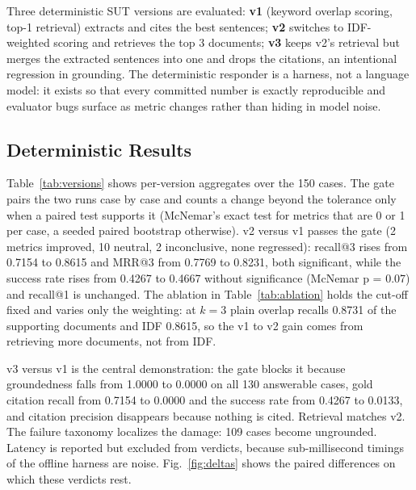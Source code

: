 \documentclass[conference]{IEEEtran}
\begin{document}
Three deterministic SUT versions are evaluated: \textbf{v1} (keyword
overlap scoring, top-1 retrieval) extracts and cites the best sentences;
\textbf{v2} switches to IDF-weighted scoring and retrieves the top 3
documents; \textbf{v3} keeps v2's retrieval but merges the extracted
sentences into one and drops the citations, an intentional regression in
grounding. The deterministic responder is a harness, not a language model:
it exists so that every committed number is exactly reproducible and
evaluator bugs surface as metric changes rather than hiding in model noise.

\subsection{Deterministic Results}
Table~\ref{tab:versions} shows per-version aggregates over the 150 cases.
The gate pairs the two runs case by case and counts a change beyond the
tolerance only when a paired test supports it (McNemar's exact test for
metrics that are 0 or 1 per case, a seeded paired bootstrap otherwise).
v2 versus v1 passes the gate (2 metrics improved, 10 neutral, 2
inconclusive, none regressed): recall@3 rises from 0.7154 to 0.8615 and
MRR@3 from 0.7769 to 0.8231, both significant, while the success rate rises
from 0.4267 to 0.4667 without significance (McNemar p = 0.07) and recall@1
is unchanged. The ablation in Table~\ref{tab:ablation} holds the cut-off
fixed and varies only the weighting: at $k=3$ plain overlap recalls 0.8731
of the supporting documents and IDF 0.8615, so the v1 to v2 gain comes from
retrieving more documents, not from IDF.

v3 versus v1 is the central demonstration: the gate blocks it because
groundedness falls from 1.0000 to 0.0000 on all 130 answerable cases, gold
citation recall from 0.7154 to 0.0000 and the success rate from 0.4267 to
0.0133, and citation precision disappears because nothing is cited.
Retrieval matches v2. The failure taxonomy localizes the damage: 109 cases
become ungrounded. Latency is reported but excluded from verdicts, because
sub-millisecond timings of the offline harness are noise.
Fig.~\ref{fig:deltas} shows the paired differences on which these verdicts
rest.
\end{document}
